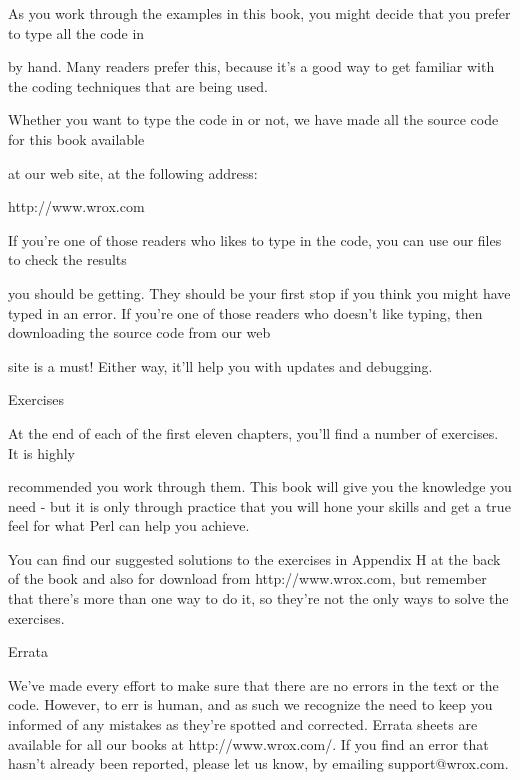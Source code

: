 \documentclass[a4paper,11pt]{book}
\begin{document}
\noindent As you work through the examples in this book, you might decide that you prefer to type all the code in

\noindent by hand. Many readers prefer this, because it's a good way to get familiar with the coding techniques that are being used.

\noindent 

\noindent Whether you want to type the code in or not, we have made all the source code for this book available

\noindent at our web site, at the following address:

\noindent 

\noindent http://www.wrox.com

\noindent 

\noindent If you're one of those readers who likes to type in the code, you can use our files to check the results

\noindent you should be getting. They should be your first stop if you think you might have typed in an error. If you're one of those readers who doesn't like typing, then downloading the source code from our web

\noindent site is a must! Either way, it'll help you with updates and debugging.

\noindent 

\noindent Exercises

\noindent 

\noindent At the end of each of the first eleven chapters, you'll find a number of exercises. It is highly

\noindent recommended you work through them. This book will give you the knowledge you need - but it is only through practice that you will hone your skills and get a true feel for what Perl can help you achieve.

\noindent You can find our suggested solutions to the exercises in Appendix H at the back of the book and also for download from http://www.wrox.com, but remember that there's more than one way to do it, so they're not the only ways to solve the exercises.

\noindent 

\noindent 

\noindent Errata

\noindent 

\noindent We've made every effort to make sure that there are no errors in the text or the code. However, to err is human, and as such we recognize the need to keep you informed of any mistakes as they're spotted and corrected. Errata sheets are available for all our books at http://www.wrox.com/. If you find an error that hasn't already been reported, please let us know, by emailing support@wrox.com.
\end{document}
